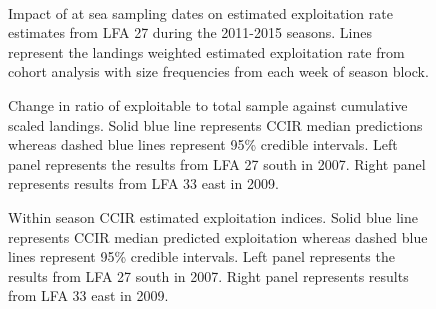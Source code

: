 \documentclass[11pt]{article}
\newcommand{\D}{.}
\newcommand{\e}{/backup/bio_data/bio.lobster/figures/} %
\begin{document}
\begin{landscape}
\begin{figure}
        \centering
         \\
                     \caption{Impact of at sea sampling dates on estimated exploitation rate estimates from LFA 27 during the 2011-2015 seasons. Lines represent the landings weighted estimated exploitation rate from cohort analysis with size frequencies from each week of season block.}
        \end{figure}


\begin{figure}
\centering
              \caption{Change in ratio of exploitable to total sample against cumulative scaled landings. Solid blue line represents CCIR median predictions whereas dashed blue lines represent 95\% credible intervals. Left panel represents the results from LFA 27 south in 2007. Right panel represents results from LFA 33 east in 2009.}
\end{figure}


\begin{figure}
\centering
             \caption{Within season CCIR estimated exploitation indices. Solid blue line represents CCIR median predicted exploitation whereas dashed blue lines represent 95\% credible intervals. Left panel represents the results from LFA 27 south in 2007. Right panel represents results from LFA 33 east in 2009.}
\end{figure}


\end{landscape}
\end{document}
